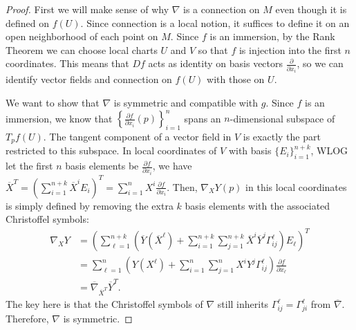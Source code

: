 \documentclass[12pt]{article}
\begin{document}
\begin{proof}
First we will make sense of why $ \nabla $ is a connection on $ M$ even though it is defined on  $ f(U)$. Since connection is a local notion, it suffices to define it on an open neighborhood of each point on $ M$. Since $ f$ is an immersion, by the Rank Theorem we can choose local charts  $ U$ and  $ V$ so that  $ f$ is injection into the first  $ n$ coordinates. This means that  $ Df$ acts as identity on basis vectors  $ \frac{\partial }{\partial x_i} $, so we can identify vector fields and connection on $ f(U)$ with those on  $ U$.

	We want to show that $ \nabla $ is symmetric and compatible with $ g$.  Since $ f$ is an immersion, we know that  $\left\{ \frac{\partial f}{\partial x_i}(p) \right\}_{i=1}^{n} $ spans an $ n$-dimensional subspace of  $ T_p f(U)$. The tangent component of a vector field in $ V$ is exactly the part restricted to this subspace. In local coordinates of $ V$ with basis $ \{E_i\}_{i=1}^{n+k} $, WLOG let the first $ n$ basis elements be  $ \frac{\partial f}{\partial x_i} $, we have $ \overline{X}^{T} = \left(\sum_{ i= 1}^{ n+k} \overline{X}^{i} E_i \right)^{T} =  \sum_{ i= 1}^{ n} X^{i} \frac{\partial f}{\partial x_i}  $. Then, $ \nabla _X Y(p)$ in this local coordinates is simply defined by removing the extra $ k$ basis elements with the associated Christoffel symbols:
	\begin{align}
		\nabla _X Y &= \left( \sum_{ \ell = 1}^{ n+k} \left( \overline{Y}(\overline{X}^{ \ell}) + \sum_{ i= 1}^{ n+k} \sum_{ j= 1}^{ n+k} \overline{X}^{i} \overline{Y}^{j} \Gamma_{ij}^{ \ell} \right) E_{ \ell} \right)^{T}   \\
		&= \sum_{ \ell = 1}^{ n} \left(Y(X^{ \ell}) + \sum_{ i= 1}^{ n} \sum_{ j= 1}^{ n} X^{i} Y^{j} \Gamma_{ij}^{ \ell} \right) \frac{\partial f}{\partial x_{ \ell}}\\
		&= \overline{\nabla } _{\overline{X}^{T}} \overline{Y}^{T} .
	\end{align}
The key here is that the Christoffel symbols of $ \nabla $ still inherits $ \Gamma_{ij}^{ \ell} = \Gamma_{ji}^{ \ell}$ from $ \overline{ \nabla }$. Therefore, $ \nabla $ is symmetric.


\end{proof}
\end{document}
